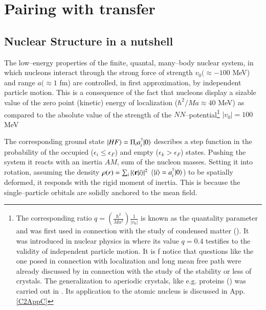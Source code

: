 \chapter{Pairing with transfer}\label{chapter1}
\section{Nuclear Structure in a nutshell}\label{C1S1}
The low--energy properties of the finite, quantal, many--body nuclear system, in which nucleons interact through the strong force of strength $v_0(\approx -100$ MeV) and range $a(\approx 1$ fm) are controlled, in first approximation, by independent particle motion. This is a consequence of the fact that nucleons display a sizable value of the zero point (kinetic) energy of localization ($\hbar^2/Ma\approx 40$ MeV) as compared to the absolute value of the strength of the $NN$--potential\footnote{The corresponding ratio $q=\left(\frac{\hbar^2}{Ma^2}\right)\frac{1}{|v_0|}$ is known as the quantality parameter and was first used in connection with the study of condensed matter (\cite{deBoer:48,deBoer:57,deBoer:48b,Nasanov:76}). It was introduced in nuclear physics in \cite{Mottelson:02} where its value $q=0.4$ testifies to the validity of independent particle motion. It is f notice that questions like the one posed in connection with localization and long mean free path were already discussed by \cite{Lindemann:10} in connection with the study of the stability or less of crystals. The generalization to aperiodic crystals, like e.g. proteins (\cite{Schrodinger:44}) was carried out in \cite{Stillinger:90}. Its application to the atomic nucleus is discussed in App. \ref{C2AppC} } $|v_0|=100$ MeV 

The corresponding ground state $|{HF} \rangle=\Pi_ia^\dagger_i|{0} \rangle$ describes a step function in the probability of the occupied ($\epsilon_i\leq \epsilon_F$) and empty ($\epsilon_k>\epsilon_F$) states. Pushing the system it reacts with an inertia $AM$, sum of the nucleon masses. Setting it into rotation, assuming the density $\rho(r)=\sum_i|\langle {\mathbf r|i} \rangle|^2$ ($|{i} \rangle=a^\dagger_i|{0} \rangle$) to be spatially deformed, it responds with the rigid moment of inertia. This is because the single--particle orbitals are solidly anchored to the mean field.

